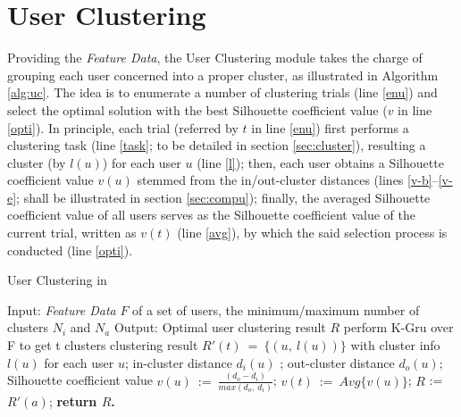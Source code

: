 \section{User Clustering}
\label{sec:uc}


\par Providing the \textit{Feature Data}, the User Clustering module takes the charge of grouping each user concerned into a proper cluster,
as illustrated in  Algorithm \ref{alg:uc}.
%
The idea is to enumerate a number of clustering trials (line \ref{enu}) and select the optimal solution with the best Silhouette coefficient value ($v$ in line \ref{opti}).
In principle, each trial (referred by $t$ in line \ref{enu}) first performs a clustering task (line \ref{task}; to be detailed in section \ref{sec:cluster}), resulting a cluster (by $l(u)$) for each user $u$ (line \ref{l});
then, each user obtains a Silhouette coefficient value $v(u)$ stemmed from the in/out-cluster distances (lines \ref{v-b}--\ref{v-e}; shall be illustrated in section \ref{sec:compu});
finally, the averaged Silhouette coefficient value of all users serves as the Silhouette coefficient value of the current trial, written as $v(t)$ (line \ref{avg}), by which the said selection process is conducted (line \ref{opti}).


\begin{algorithm}[t]
\begin{small}
\caption{User Clustering in \sys{}}
\label{alg:uc}
\begin{algorithmic}[1]
\State Input: \textit{Feature Data} $F$  of a set of users, the minimum/maximum number of clusters $N_i$ and $N_a$
\State Output: Optimal user clustering result $R$
\vspace{1ex}
 \label{enu}
    \State perform K-Gru over F to get t clusters \label{task}
	\State clustering result $R'(t)\ =\ \{(u,\ l(u))\}$ with cluster info $l(u)$ for each user $u$; \label{l}
		\State in-cluster distance $d_i(u)$ \label{v-b};
		\State out-cluster distance $d_o(u)$;
		\State Silhouette coefficient value $v(u)\ :=\ \frac{(d_o - d_i)}{max(d_o,\ d_i)}$; \label{v-e}
	\EndFor
	\State $v(t)\ :=\ Avg\{v(u)\}$; \label{avg}
\EndFor
{} \label{opti}
	\State $R$ := $R'(a)$;
\EndIf
\State \bfseries{return} $R$.
\end{algorithmic}
\end{small}
\end{algorithm}


